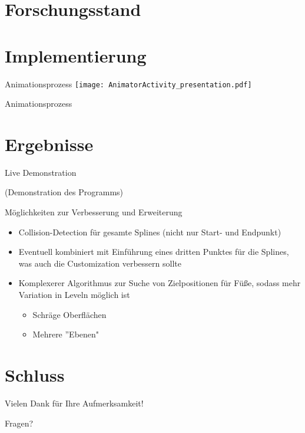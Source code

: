 \documentclass[t,aspectratio=169,divpsnames]{beamer}
\begin{document}
\section{Forschungsstand}

\section{Implementierung}

\begin{frame}{Animationsprozess}
    \texttt{[image: AnimatorActivity\_presentation.pdf]}
\end{frame}

\begin{frame}{Animationsprozess}

\end{frame}

\section{Ergebnisse}
\begin{frame}{Live Demonstration}
    \begin{center}
        \huge{(Demonstration des Programms)}
    \end{center}
\end{frame}

\begin{frame}{Möglichkeiten zur Verbesserung und Erweiterung}
    \begin{itemize}
        \item Collision-Detection für gesamte Splines (nicht nur Start- und Endpunkt)
        \item Eventuell kombiniert mit Einführung eines dritten Punktes für die Splines, was auch die Customization verbessern sollte
        \item Komplexerer Algorithmus zur Suche von Zielpositionen für Füße, sodass mehr Variation in Leveln möglich ist
              \begin{itemize}
                  \item Schräge Oberflächen
                  \item Mehrere ''Ebenen"
              \end{itemize}
    \end{itemize}
\end{frame}

\section*{Schluss}
\begin{frame}
    \begin{center}
        \huge{Vielen Dank für Ihre Aufmerksamkeit!}
    \end{center}
    \begin{center}
        \Huge{Fragen?}
    \end{center}
\end{frame}

\begin{frame}[allowframebreaks]{\bibname}
\end{frame}
\end{document}
